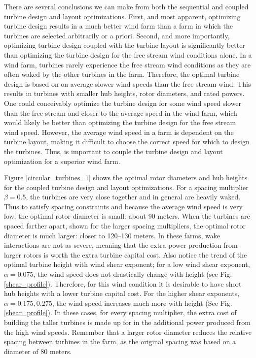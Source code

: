 There are several conclusions we can make from both the sequential and coupled turbine design and layout optimizations. First, and most apparent, optimizing turbine design results in a much better wind farm than a farm in which the turbines are selected arbitrarily or a priori. Second, and more importantly, optimizing turbine design coupled with the turbine layout is significantly better than optimizing the turbine design for the free stream wind conditions alone. In a wind farm, turbines rarely experience the free stream wind conditions as they are often waked by the other turbines in the farm. Therefore, the optimal turbine design is based on on average slower wind speeds than the free stream wind. This results in turbines with smaller hub heights, rotor diameters, and rated powers. 
%
One could conceivably optimize the turbine design for some wind speed slower than the free stream and closer to the average speed in the wind farm, which would likely be better than optimizing the turbine design for the free stream wind speed. However, the average wind speed in a farm is dependent on the turbine layout, making it difficult to choose the correct speed for which to design the turbines. Thus, is important to couple the turbine design and layout optimization for a superior wind farm. 

Figure \ref{circular_turbines_1} shows the optimal rotor diameters and hub heights for the coupled turbine design and layout optimizations. For a spacing multiplier $\beta=0.5$, the turbines are very close together and in general are heavily waked. Thus to satisfy spacing constraints and because the average wind speed is very low, the optimal rotor diameter is small: about 90 meters. When the turbines are spaced farther apart, shown for the larger spacing multipliers, the optimal rotor diameter is much larger: closer to 120--130 meters. In these farms, wake interactions are not as severe, meaning that the extra power production from larger rotors is worth the extra turbine capital cost. Also notice the trend of the optimal turbine height with wind shear exponent; for a low wind shear exponent, $\alpha=0.075$, the wind speed does not drastically change with height (see Fig. \ref{shear_profile}). Therefore, for this wind condition it is desirable to have short hub heights with a lower turbine capital cost. For the higher shear exponents, $\alpha=0.175,0.275$, the wind speed increases much more with height (See Fig. \ref{shear_profile}). In these cases, for every spacing multiplier, the extra cost of building the taller turbines is made up for in the additional power produced from the high wind speeds. Remember that a larger rotor diameter reduces the relative spacing between turbines in the farm, as the original spacing was based on a diameter of 80 meters.

